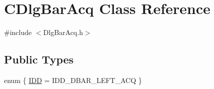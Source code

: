 \hypertarget{classCDlgBarAcq}{
\section{CDlgBarAcq Class Reference}
\label{classCDlgBarAcq}
}


{\ttfamily \#include $<$DlgBarAcq.h$>$}

\subsection*{Public Types}
\begin{DoxyCompactItemize}
\item 
enum \{ \hyperlink{classCDlgBarAcq_a247d77fbf3f0244ba55345223e6a5d1fa978c34947e9dab2a99168ee6e611e11b}{IDD} =  IDD\_\-DBAR\_\-LEFT\_\-ACQ
 \}
\end{DoxyCompactItemize}
